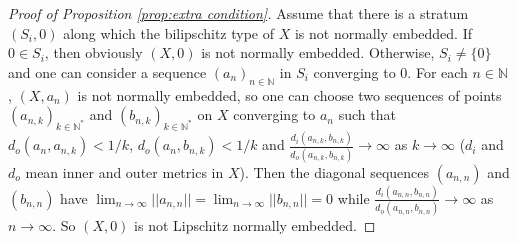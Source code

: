 \documentclass{amsart}
\begin{document}
\begin{proof}[Proof of Proposition \ref{prop:extra condition}]
  Assume that there is a stratum $(S_i,0)$ along which the bilipschitz
  type of $X$ is not normally embedded. If $0 \in S_i$, then obviously
  $(X,0)$ is not normally embedded. Otherwise, $S_i \neq \{0\}$ and
  one can consider a sequence $(a_n)_{n\in \mathbb N}$ in $S_i$ converging to
  0. For each $n\in \mathbb N$, $(X,a_n)$ is not normally embedded, so one
  can choose two sequences of points $(a_{n,k})_{k \in \mathbb N^*}$ and
  $(b_{n,k})_{k \in \mathbb N^*}$ on $X$ converging to $a_n$ such that
  $d_o(a_n, a_{n,k}) <1/k$, $d_o(a_n, b_{n,k}) <1/k$ and
  $\frac{d_i(a_{n,k}, b_{n,k})}{d_o(a_{n,k}, b_{n,k})}\to\infty$ as
  $k\to\infty$ ($d_i$ and $d_o$ mean inner and outer metrics in
  $X$). Then the diagonal sequences $(a_{n,n})$ and $(b_{n,n})$ have
  $\lim_{n \to \infty} ||a_{n,n}|| = \lim_{n \to \infty} ||b_{n,n}|| =
  0$ while
  $\frac{d_i(a_{n,n}, b_{n,n})}{d_o(a_{n,n}, b_{n,n})}\to \infty$ as
  $n\to\infty$. So $(X,0)$ is not Lipschitz normally embedded.
\end{proof}
       
\end{document}

